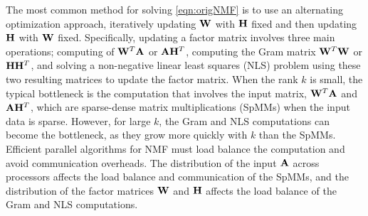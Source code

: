 The most common method for solving \cref{eqn:origNMF} is to use an alternating optimization approach, iteratively updating $\WW$ with $\HH$ fixed and then updating $\HH$ with $\WW$ fixed.
Specifically, updating a factor matrix involves three main operations; computing of $\WW^T\AA$ or $\AA\Hm^T$, computing the Gram matrix $\Wm^T \Wm$ or $\Hm \Hm^T$, and solving a non-negative linear least squares (NLS) problem using these two resulting matrices to update the factor matrix.
When the rank $k$ is small, the typical bottleneck is the computation that involves the input matrix, $\WW^T\AA$ and $\AA\Hm^T$, which are sparse-dense matrix multiplications (SpMMs) when the input data is sparse.
However, for large $k$, the Gram and NLS computations can become the bottleneck, as they grow more quickly with $k$ than the SpMMs.
Efficient parallel algorithms for NMF must load balance the computation and avoid communication overheads.
The distribution of the input $\AA$ across processors affects the load balance and communication of the SpMMs, and the distribution of the factor matrices $\WW$ and $\HH$ affects the load balance of the Gram and NLS computations.

